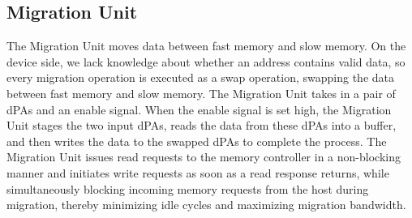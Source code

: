 \subsection{Migration Unit}
The Migration Unit moves data between fast memory and slow memory. 
On the device side, we lack knowledge about whether an address contains valid data, so every migration operation is executed as a swap operation, swapping the data between fast memory and slow memory. 
The Migration Unit takes in a pair of dPAs and an enable signal. 
When the enable signal is set high, the Migration Unit stages the two input dPAs, reads the data from these dPAs into a buffer, and then writes the data to the swapped dPAs to complete the process. 
The Migration Unit issues read requests to the memory controller in a non-blocking manner and initiates write requests as soon as a read response returns, while simultaneously blocking incoming memory requests from the host during migration, thereby minimizing idle cycles and maximizing migration bandwidth.

